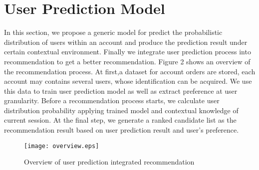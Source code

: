 \documentclass{sig-alternate-05-2015}
\begin{document}
\section{User Prediction Model}
In this section, we propose a generic model for predict the probabilistic distribution of users within an account and produce the prediction result under certain contextual environment. Finally we integrate user prediction process into recommendation to get a better recommendation. Figure 2 shows an overview of the recommendation process. At first,a dataset for account orders are stored, each account may contains several users, whose identification can be acquired. We use this data to train user prediction model as well as extract preference at user granularity. Before a recommendation process starts, we calculate user distribution probability applying trained model and contextual knowledge of current session. At the final step, we generate a ranked candidate list as the recommendation result based on user prediction result and user's preference.\par
\begin{figure}[!hbt]
\centering
\texttt{[image: overview.eps]}
\caption{Overview of user prediction integrated recommendation}
\label{fig:Prob}
\end{figure}\par
\end{document}
